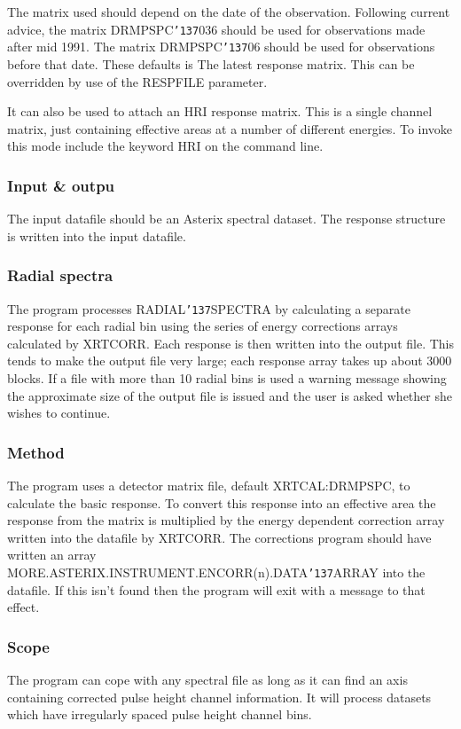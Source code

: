 \documentclass{book}
\renewcommand{\_}{{\tt\char'137}}     %
\begin{document}
The matrix used should depend on the date of the observation.
Following current advice, the matrix DRMPSPC\_036 should be used for
observations made after mid 1991. The matrix DRMPSPC\_06 should be used
for observations before that date. These defaults is The latest
response matrix. This can be overridden by use of the RESPFILE
parameter.
 
It can also be used to attach an HRI response matrix. This is a
single channel matrix, just containing effective areas at a number
of different energies. To invoke this mode include the keyword
HRI on the command line.
 
\subsubsection{Input \& outpu}
The input datafile should be an Asterix spectral dataset.
The response structure is written into the input datafile.
 
\subsubsection{Radial spectra}
The program processes RADIAL\_SPECTRA by calculating a separate
response for each radial bin using the series of energy corrections
arrays calculated by XRTCORR. Each response is then written into
the output file. This tends to make the output file very large;
each response array takes up about 3000 blocks. If a file with
more than 10 radial bins is used a warning message showing the
approximate size of the output file is issued and the user is
asked whether she wishes to continue.
 
\subsubsection{Method}
The program uses a detector matrix file, default XRTCAL:DRMPSPC,
to calculate the basic response. To convert this response into an
effective area the response from the matrix is multiplied by the
energy dependent correction array written into the datafile by
XRTCORR. The corrections program should have written an array
MORE.ASTERIX.INSTRUMENT.ENCORR(n).DATA\_ARRAY into the datafile. If
this isn't found then the program will exit with a message to that
effect.
 
\subsubsection{Scope}
The program can cope with any spectral file as long as it can find
an axis containing corrected pulse height channel information. It
will process datasets which have irregularly spaced pulse height
channel bins.
 
\end{document}
